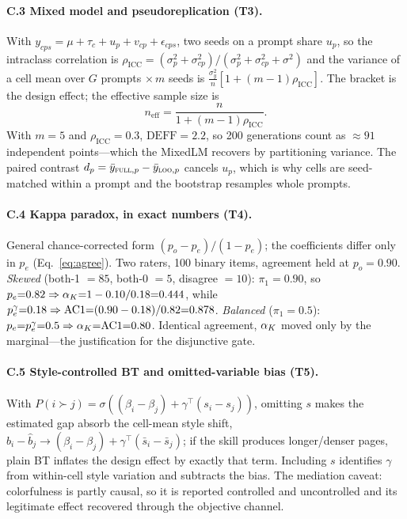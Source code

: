 \paragraph{C.3 Mixed model and pseudoreplication (T3).} With $y_{cps}=\mu+\tau_c+u_p+v_{cp}+
\epsilon_{cps}$, two seeds on a prompt share $u_p$, so the intraclass correlation is
$\rho_{\mathrm{ICC}}=(\sigma_p^2+\sigma_{cp}^2)/(\sigma_p^2+\sigma_{cp}^2+\sigma^2)$ and the variance of
a cell mean over $G$ prompts $\times\,m$ seeds is $\tfrac{\sigma_y^2}{n}[1+(m-1)\rho_{\mathrm{ICC}}]$.
The bracket is the design effect; the effective sample size is
\begin{equation}
n_{\text{eff}}=\frac{n}{1+(m-1)\rho_{\mathrm{ICC}}}.
\label{eq:neff}
\end{equation}
With $m{=}5$ and $\rho_{\mathrm{ICC}}{=}0.3$, $\mathrm{DEFF}{=}2.2$, so 200 generations count as
$\approx91$ independent points---which the MixedLM recovers by partitioning variance. The paired
contrast $d_p=\bar y_{\textsc{full},p}-\bar y_{\textsc{loo},p}$ cancels $u_p$, which is why cells are seed-matched
within a prompt and the bootstrap resamples whole prompts.

\paragraph{C.4 Kappa paradox, in exact numbers (T4).} General chance-corrected form
$(p_o-p_e)/(1-p_e)$; the coefficients differ only in $p_e$ (Eq.~\ref{eq:agree}). Two raters, 100 binary
items, agreement held at $p_o{=}0.90$. \emph{Skewed} (both-1 $=85$, both-0 $=5$, disagree $=10$):
$\pi_1{=}0.90$, so $p_e{=}0.82\Rightarrow\alpha_{K}{=}1-0.10/0.18{=}0.444$, while
$p_e^{\gamma}{=}0.18\Rightarrow\mathrm{AC1}{=}(0.90-0.18)/0.82{=}0.878$. \emph{Balanced} ($\pi_1{=}0.5$):
$p_e{=}p_e^{\gamma}{=}0.5\Rightarrow\alpha_{K}{=}\mathrm{AC1}{=}0.80$. Identical agreement, $\alpha_{K}$ moved only by
the marginal---the justification for the disjunctive gate.

\paragraph{C.5 Style-controlled BT and omitted-variable bias (T5).} With
$P(i\succ j)=\sigma((\beta_i-\beta_j)+\gamma^{\top}(s_i-s_j))$, omitting $s$ makes the estimated gap
absorb the cell-mean style shift, $\hat b_i-\hat b_j\to(\beta_i-\beta_j)+\gamma^{\top}(\bar s_i-\bar s_j)$;
if the skill produces longer/denser pages, plain BT inflates the design effect by exactly that term.
Including $s$ identifies $\gamma$ from within-cell style variation and subtracts the bias. The
mediation caveat: colorfulness is partly causal, so it is reported controlled and uncontrolled and its
legitimate effect recovered through the objective channel.

